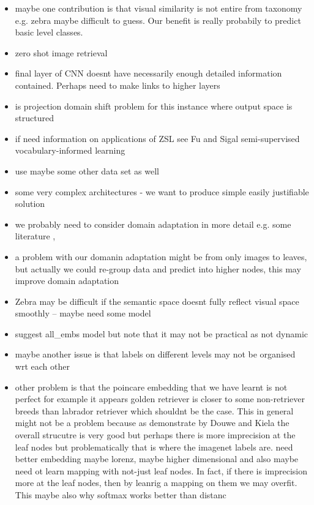 \documentclass[12pt]{report}
\begin{document}
\begin{itemize}
    \item maybe one contribution is that visual similarity is not entire from taxonomy e.g. zebra maybe difficult to guess. Our benefit is really probabily to predict basic level classes. 
    \item zero shot image retrieval
    \item final layer of CNN doesnt have necessarily enough detailed information contained. Perhaps need to make links to higher layers \cite{Ba2015}
    \item is projection domain shift problem for this instance where output space is structured
    \item if need information on applications of ZSL see Fu and Sigal semi-supervised vocabulary-informed learning
    \item use maybe some other data set as well
    \item some very complex architectures - we want to produce simple easily justifiable solution
    \item we probably need to consider domain adaptation in more detail e.g. some literature \cite{Patel2015}, \cite{Wang2018}
    \item a problem with our domanin adaptation might be from only images to leaves, but actually we could re-group data and predict into higher nodes, this may improve domain adaptation
    \item Zebra may be difficult if the semantic space doesnt fully reflect visual space smoothly -- maybe need some model 
    \item suggest all\_embs model but note that it may not be practical as not dynamic
    \item maybe another issue is that labels on different levels may not be organised wrt each other
    \item other problem is that the poincare embedding that we have learnt is not perfect for example it appears golden retriever is closer to some non-retriever breeds than labrador retriever which shouldnt be the case. This in general might not be a problem because as demonstrate by Douwe and Kiela the overall strucutre is very good but perhaps there is more imprecision at the leaf nodes but problematically that is where the imagenet labels are. need better embedding maybe lorenz, maybe higher dimensional and also maybe need ot learn mapping with not-just leaf nodes. In fact, if there is imprecision more at the leaf nodes, then by leanrig a mapping on them we may overfit. This maybe also why softmax works better than distanc

\end{itemize}
\end{document}
